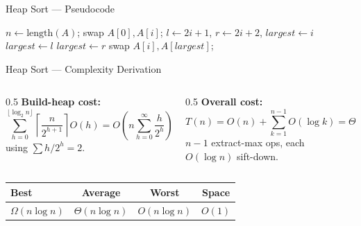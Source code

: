 \documentclass[9pt,aspectratio=169]{beamer}
\begin{document}
\begin{frame}{Heap Sort --- Pseudocode}
\begin{algorithm}[H]
\footnotesize
\begin{algorithmic}[1]
  \State $n \gets \text{length}(A)$; \quad {}
     \State swap $A[0], A[i]$; \quad {}
  \EndFor
\EndProcedure
{}
  \State $l\gets 2i{+}1$, $r\gets 2i{+}2$, $largest \gets i$
   $largest\gets l$ \EndIf
   $largest\gets r$ \EndIf
     \State swap $A[i], A[largest]$; \quad {}
  \EndIf
\EndProcedure
\end{algorithmic}
\end{algorithm}
\end{frame}

\begin{frame}{Heap Sort --- Complexity Derivation}
\begin{columns}[T]
\begin{column}{0.5\textwidth}
\textbf{Build-heap cost:}
\[
\sum_{h=0}^{\lfloor\log_2 n\rfloor}\left\lceil\frac{n}{2^{h+1}}\right\rceil O(h) = O\!\left(n\sum_{h=0}^{\infty}\frac{h}{2^h}\right)=O(n)
\]
using \(\sum h/2^h = 2\).
\end{column}
\begin{column}{0.5\textwidth}
\textbf{Overall cost:}
\[
T(n) = O(n) + \sum_{k=1}^{n-1}O(\log k) = \Theta(n\log n)
\]
\(n{-}1\) extract-max ops, each \(O(\log n)\) sift-down.
\end{column}
\end{columns}
\vspace{3mm}
\begin{table}\small
\begin{tabular}{lccc}
\toprule
Best & Average & Worst & Space\\
\midrule
\(\Omega(n\log n)\) & \(\Theta(n\log n)\) & \(O(n\log n)\) & \(O(1)\)\\
\bottomrule
\end{tabular}
\end{table}
\end{frame}
\end{document}
